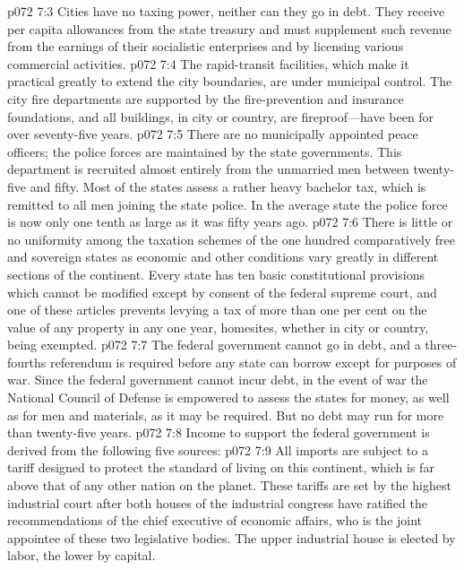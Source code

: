 \pc \vs p072 7:3 Cities have no taxing power, neither can they go in debt. They receive per capita allowances from the state treasury and must supplement such revenue from the earnings of their socialistic enterprises and by licensing various commercial activities.
\vs p072 7:4 The rapid\hyp{}transit facilities, which make it practical greatly to extend the city boundaries, are under municipal control. The city fire departments are supported by the fire\hyp{}prevention and insurance foundations, and all buildings, in city or country, are fireproof---have been for over seventy\hyp{}five years.
\vs p072 7:5 There are no municipally appointed peace officers; the police forces are maintained by the state governments. This department is recruited almost entirely from the unmarried men between twenty\hyp{}five and fifty. Most of the states assess a rather heavy bachelor tax, which is remitted to all men joining the state police. In the average state the police force is now only one tenth as large as it was fifty years ago.
\pc \vs p072 7:6 There is little or no uniformity among the taxation schemes of the one hundred comparatively free and sovereign states as economic and other conditions vary greatly in different sections of the continent. Every state has ten basic constitutional provisions which cannot be modified except by consent of the federal supreme court, and one of these articles prevents levying a tax of more than one per cent on the value of any property in any one year, homesites, whether in city or country, being exempted.
\vs p072 7:7 The federal government cannot go in debt, and a three\hyp{}fourths referendum is required before any state can borrow except for purposes of war. Since the federal government cannot incur debt, in the event of war the National Council of Defense is empowered to assess the states for money, as well as for men and materials, as it may be required. But no debt may run for more than twenty\hyp{}five years.
\pc \vs p072 7:8 Income to support the federal government is derived from the following five sources:
\pc \vs p072 7:9 \bibnobreakspace {} All imports are subject to a tariff designed to protect the standard of living on this continent, which is far above that of any other nation on the planet. These tariffs are set by the highest industrial court after both houses of the industrial congress have ratified the recommendations of the chief executive of economic affairs, who is the joint appointee of these two legislative bodies. The upper industrial house is elected by labor, the lower by capital.

